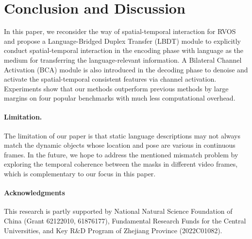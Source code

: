\documentclass[10pt,twocolumn,letterpaper]{article}
\begin{document}
\section{Conclusion and Discussion}
\label{sec:conclu}

In this paper, we reconsider the way of spatial-temporal interaction for RVOS and propose a Language-Bridged Duplex Transfer (LBDT) module to explicitly conduct spatial-temporal interaction in the encoding phase with language as the medium for transferring the language-relevant information. A Bilateral Channel Activation (BCA) module is also introduced in the decoding phase to denoise and activate the spatial-temporal consistent features via channel activation. Experiments show that our methods outperform previous methods by large margins on four popular benchmarks with much less computational overhead.

\paragraph{Limitation.} The limitation of our paper is that static language descriptions may not always match the dynamic objects whose location and pose are various in continuous frames. In the future, we hope to address the mentioned mismatch problem by exploring the temporal coherence between the masks in different video frames, which is complementary to our focus
in this paper.

\paragraph{Acknowledgments} This research is partly supported by National Natural Science Foundation of China (Grant 62122010, 61876177), Fundamental Research Funds for the Central Universities, and Key R\&D Program of Zhejiang Province (2022C01082). 

{\small


}
\end{document}
